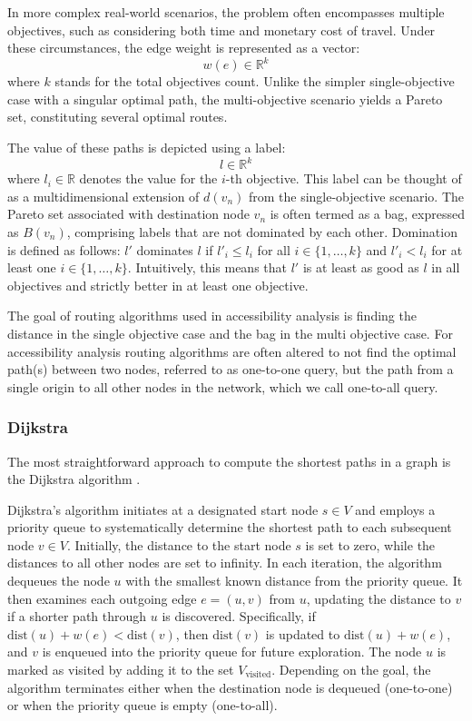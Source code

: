 In more complex real-world scenarios, the problem often encompasses multiple objectives, such as considering both time and monetary cost of travel.
Under these circumstances, the edge weight is represented as a vector:
\[ w(e) \in \mathbb{R}^k \]
where \( k \) stands for the total objectives count.
Unlike the simpler single-objective case with a singular optimal path, the multi-objective scenario yields a Pareto set, constituting several optimal routes.

The value of these paths is depicted using a label:
\[ l \in \mathbb{R}^k \]
where \( l_i \in \mathbb{R} \) denotes the value for the \( i \)-th objective.
This label can be thought of as a multidimensional extension of \( d(v_n) \) from the single-objective scenario.
The Pareto set associated with destination node \( v_n \) is often termed as a bag, expressed as \( B(v_n) \), comprising labels that are not dominated by each other.
Domination is defined as follows: \( l' \) dominates \( l \) if \( l'_i \leq l_i \) for all \( i \in \{1, \dots, k\} \) and \( l'_i < l_i \) for at least one \( i \in \{1, \dots, k\} \).
Intuitively, this means that \( l' \) is at least as good as \( l \) in all objectives and strictly better in at least one objective.

The goal of routing algorithms used in accessibility analysis is finding the distance in the single objective case and the bag in the multi objective case.
For accessibility analysis routing algorithms are often altered to not find the optimal path(s) between two nodes, referred to as one-to-one query, but the path from a single origin to all other nodes in the network, which we call one-to-all query.

\subsubsection{Dijkstra}
\label{subsubsec:dijkstra}
The most straightforward approach to compute the shortest paths in a graph is the Dijkstra algorithm \cite{dijkstra1959note}.

Dijkstra's algorithm initiates at a designated start node \( s \in V \) and employs a priority queue to systematically determine the shortest path to each subsequent node \( v \in V \).
Initially, the distance to the start node \( s \) is set to zero, while the distances to all other nodes are set to infinity.
In each iteration, the algorithm dequeues the node \( u \) with the smallest known distance from the priority queue.
It then examines each outgoing edge \( e = (u, v) \) from \( u \), updating the distance to \( v \) if a shorter path through \( u \) is discovered.
Specifically, if \( \text{dist}(u) + w(e) < \text{dist}(v) \), then \( \text{dist}(v) \) is updated to \( \text{dist}(u) + w(e) \), and \( v \) is enqueued into the priority queue for future exploration.
The node \( u \) is marked as visited by adding it to the set \( V_{\text{visited}} \).
Depending on the goal, the algorithm terminates either when the destination node is dequeued (one-to-one) or when the priority queue is empty (one-to-all).


